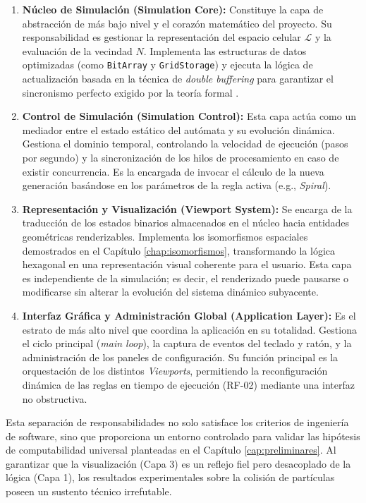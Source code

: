 \begin{enumerate}
    \item \textbf{Núcleo de Simulación (Simulation Core):} Constituye la capa de abstracción de más bajo nivel y el corazón matemático del proyecto. Su responsabilidad es gestionar la representación del espacio celular $\mathcal{L}$ y la evaluación de la vecindad $N$. Implementa las estructuras de datos optimizadas (como \texttt{BitArray} y \texttt{GridStorage}) y ejecuta la lógica de actualización basada en la técnica de \textit{double buffering} para garantizar el sincronismo perfecto exigido por la teoría formal \cite{Toffoli1987}.
    
    \item \textbf{Control de Simulación (Simulation Control):} Esta capa actúa como un mediador entre el estado estático del autómata y su evolución dinámica. Gestiona el dominio temporal, controlando la velocidad de ejecución (pasos por segundo) y la sincronización de los hilos de procesamiento en caso de existir concurrencia. Es la encargada de invocar el cálculo de la nueva generación basándose en los parámetros de la regla activa (e.g., \textit{Spiral}).
    
    \item \textbf{Representación y Visualización (Viewport System):} Se encarga de la traducción de los estados binarios almacenados en el núcleo hacia entidades geométricas renderizables. Implementa los isomorfismos espaciales demostrados en el Capítulo \ref{chap:isomorfismos}, transformando la lógica hexagonal en una representación visual coherente para el usuario. Esta capa es independiente de la simulación; es decir, el renderizado puede pausarse o modificarse sin alterar la evolución del sistema dinámico subyacente.
    
    \item \textbf{Interfaz Gráfica y Administración Global (Application Layer):} Es el estrato de más alto nivel que coordina la aplicación en su totalidad. Gestiona el ciclo principal (\textit{main loop}), la captura de eventos del teclado y ratón, y la administración de los paneles de configuración. Su función principal es la orquestación de los distintos \textit{Viewports}, permitiendo la reconfiguración dinámica de las reglas en tiempo de ejecución (RF-02) mediante una interfaz no obstructiva.
\end{enumerate}

Esta separación de responsabilidades no solo satisface los criterios de ingeniería de software, sino que proporciona un entorno controlado para validar las hipótesis de computabilidad universal planteadas en el Capítulo \ref{cap:preliminares}. Al garantizar que la visualización (Capa 3) es un reflejo fiel pero desacoplado de la lógica (Capa 1), los resultados experimentales sobre la colisión de partículas poseen un sustento técnico irrefutable.



